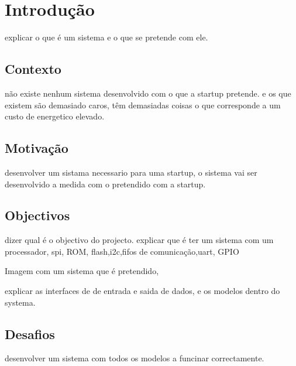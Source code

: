 
\chapter{Introdu\c{c}\~ao}
\label{chapter:introducao}

explicar o que é um sistema e o que se pretende com ele.


\section{Contexto}
\label{section:context}

n\~ao existe nenhum sistema desenvolvido com o que a startup pretende. e os que existem s\~ao demasiado caros, têm demasiadas coisas o que corresponde a um custo de energetico elevado.

\section{Motiva\c{c}\~ao}
\label{section:motiva}

desenvolver um sistama necessario para uma startup, o sistema vai ser desenvolvido a medida com o pretendido com a startup. 

\section{Objectivos}
\label{section:objectivo}

dizer qual é o objectivo do projecto. explicar que é ter um sistema com um processador, spi, ROM, flash,i2c,fifos de comunica\c{c}\~ao,uart, GPIO

Imagem com um sistema que é pretendido,

explicar as interfaces de de entrada e saida de dados, e os modelos dentro do systema.


\section{Desafios}
\label{section:desafio}

desenvolver um sistema com todos os modelos a funcinar correctamente. 
